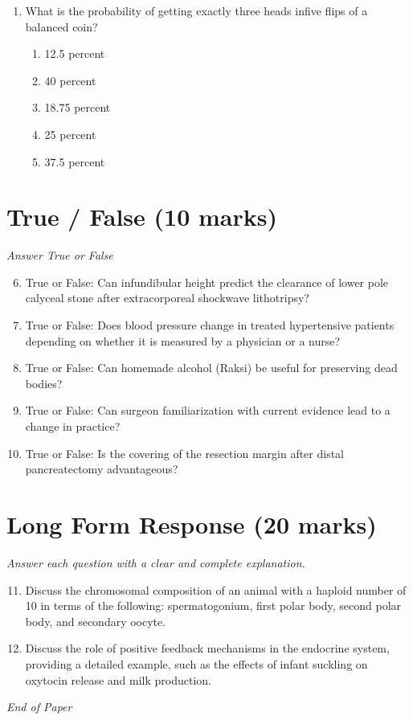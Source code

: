 \documentclass[12pt]{article}
\begin{document}
\begin{enumerate}[label=\arabic*.]
\begin{enumerate}[label=(\alph*)]
    \item Thymus
    \item pituitary gland
    \item adrenal gland
    \item thyroid gland
\end{enumerate}
\item What is the probability of getting exactly three heads infive flips of a balanced coin?
\begin{enumerate}[label=(\alph*)]
    \item 12.5 percent
    \item 40 percent
    \item 18.75 percent
    \item 25 percent
    \item 37.5 percent
\end{enumerate}
\end{enumerate}

\section*{True / False (10 marks)}
\textit{Answer True or False}
\begin{enumerate}[label=\arabic*.]
\setcounter{enumi}{5}
\item True or False: Can infundibular height predict the clearance of lower pole calyceal stone after extracorporeal shockwave lithotripsy?
\item True or False: Does blood pressure change in treated hypertensive patients depending on whether it is measured by a physician or a nurse?
\item True or False: Can homemade alcohol (Raksi) be useful for preserving dead bodies?
\item True or False: Can surgeon familiarization with current evidence lead to a change in practice?
\item True or False: Is the covering of the resection margin after distal pancreatectomy advantageous?
\end{enumerate}

\section*{Long Form Response (20 marks)}
\textit{Answer each question with a clear and complete explanation.}
\begin{enumerate}[label=\arabic*.]
\setcounter{enumi}{10}
\item Discuss the chromosomal composition of an animal with a haploid number of 10 in terms of the following: spermatogonium, first polar body, second polar body, and secondary oocyte.
\item Discuss the role of positive feedback mechanisms in the endocrine system, providing a detailed example, such as the effects of infant suckling on oxytocin release and milk production.
\end{enumerate}

\vfill
\noindent\textit{End of Paper}
\end{document}
